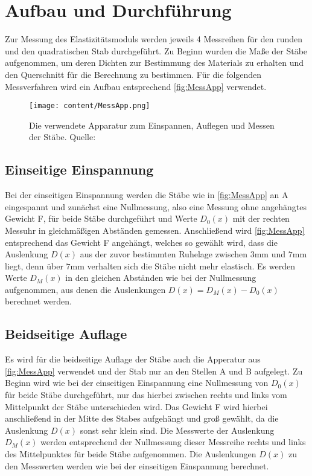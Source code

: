 \section{Aufbau und Durchführung}
\label{sec:Durchführung}
Zur Messung des Elastizitätsmoduls werden jeweils 4 Messreihen für den runden und den quadratischen Stab durchgeführt.
Zu Beginn wurden die Maße der Stäbe aufgenommen, um deren Dichten zur Bestimmung des Materials zu erhalten und den Querschnitt
für die Berechnung zu bestimmen. Für die folgenden Messverfahren wird ein Aufbau entsprechend \autoref{fig:MessApp} verwendet.
\begin{figure}[H]
    \centering
    \texttt{[image: content/MessApp.png]}
    \caption{Die verwendete Apparatur zum Einspannen, Auflegen und Messen der Stäbe. Quelle: \cite{sample}}  %
    \label{fig:MessApp}
\end{figure}
\subsection{Einseitige Einspannung}
\label{subsec:EinseitigeEinspannungAuD}
Bei der einseitigen Einspannung werden die Stäbe wie in \autoref{fig:MessApp} an A eingespannt und zunächst eine Nullmessung, also
eine Messung ohne angehängtes Gewicht F, für beide Stäbe durchgeführt und Werte $D_0(x)$ mit der rechten Messuhr in gleichmäßigen Abständen gemessen.
Anschließend wird \autoref{fig:MessApp} entsprechend das Gewicht F angehängt, welches so gewählt wird, dass die Auslenkung $D(x)$
aus der zuvor bestimmten Ruhelage zwischen $3\unit{\milli\meter}$ und $7\unit{\milli\meter}$
liegt, denn über $7\unit{\milli\meter}$ verhalten sich die Stäbe nicht mehr elastisch. Es werden Werte $D_M(x)$ in den gleichen Abständen wie bei der Nullmessung aufgenommen,
aus denen die Auslenkungen $D(x) = D_M(x) - D_0(x)$ berechnet werden.
\subsection{Beidseitige Auflage}
\label{subsec:BeidseitigeAuflageDurchf}
Es wird für die beidseitige Auflage der Stäbe auch die Apperatur aus \autoref{fig:MessApp} verwendet und der Stab nur an den Stellen A und B aufgelegt.
Zu Beginn wird wie bei der einseitigen Einspannung eine Nullmessung von $D_0(x)$ für beide Stäbe durchgeführt, nur das hierbei zwischen rechts und links vom
Mittelpunkt der Stäbe unterschieden wird. Das Gewicht F wird hierbei anschließend in der Mitte des Stabes aufgehängt und groß gewählt, da die Auslenkung $D(x)$
sonst sehr klein sind. Die Messwerte der Auslenkung $D_M(x)$ werden entsprechend der Nullmessung dieser Messreihe rechts und links des Mittelpunktes für beide
Stäbe aufgenommen. Die Auslenkungen $D(x)$ zu den Messwerten werden wie bei der einseitigen Einspannung berechnet.
